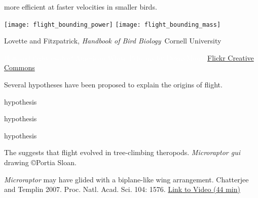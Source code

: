 \documentclass[t]{beamer}
\begin{document}
%
\begin{frame}[t,plain]{ more efficient at faster velocities in smaller birds.}

\vspace{-0.5\baselineskip}

\centering

\texttt{[image: flight\_bounding\_power]}
\hfill
\texttt{[image: flight\_bounding\_mass]}

\vfilll

\tiny \hfill Lovette and Fitzpatrick, \textit{Handbook of Bird Biology} \textcopyright\,Cornell University

\end{frame}


%
{
\begin{frame}[b,plain]{\textcolor{white}{How did flight evolve?}}
\tiny \hfill \textcolor{white}{American White Pelicans by DennyMont, \href{https://www.flickr.com/photos/92766247@N00/2537201735}{Flickr Creative Commons}, .}

\end{frame}
}
%

\begin{frame}[t,plain]{Several hypotheses have been proposed to explain the origins of flight.}

	
	\hangpara {} hypothesis
	
	\vspace{1em}
	
	\hangpara {} hypothesis

	\vspace{1em}
	
	\hangpara {} hypothesis
\end{frame}

{
\begin{frame}[b,plain]{The  suggests that flight evolved in tree-climbing theropods.}
\tiny\hfill\textit{Microraptor gui} drawing \copyright Portia Sloan.
\end{frame}
}

{
\begin{frame}[b,plain]{\textit{Microraptor} may have glided with a biplane-like wing arrangement.}
    \tiny Chatterjee and Templin 2007. Proc. Natl. Acad. Sci. 104: 1576. \hfill\href{https://www.youtube.com/watch?v=yL0UIzU0EEc}{Link to Video (44 min)}
\end{frame}
}
\end{document}

